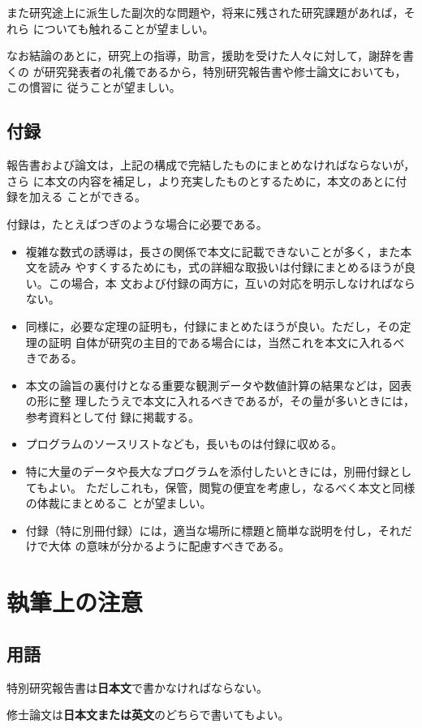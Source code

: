 \documentclass[master]{kuisthesis}		%
\let\EM\bf
\begin{document}
また研究途上に派生した副次的な問題や，将来に残された研究課題があれば，それら
についても触れることが望ましい。

なお結論のあとに，研究上の指導，助言，援助を受けた人々に対して，謝辞を書くの
が研究発表者の礼儀であるから，特別研究報告書や修士論文においても，この慣習に
従うことが望ましい。

\subsection{付録}\label{subsec-appendix}
報告書および論文は，上記の構成で完結したものにまとめなければならないが，さら
に本文の内容を補足し，より充実したものとするために，本文のあとに付録を加える
ことができる。

付録は，たとえばつぎのような場合に必要である。
\begin{itemize}%
\item
複雑な数式の誘導は，長さの関係で本文に記載できないことが多く，また本文を読み
やすくするためにも，式の詳細な取扱いは付録にまとめるほうが良い。この場合，本
文および付録の両方に，互いの対応を明示しなければならない。
\item
同様に，必要な定理の証明も，付録にまとめたほうが良い。ただし，その定理の証明
自体が研究の主目的である場合には，当然これを本文に入れるべきである。
\item
本文の論旨の裏付けとなる重要な観測データや数値計算の結果などは，図表の形に整
理したうえで本文に入れるべきであるが，その量が多いときには，参考資料として付
録に掲載する。
\item
プログラムのソースリストなども，長いものは付録に収める。
\item
特に大量のデータや長大なプログラムを添付したいときには，別冊付録としてもよい。
ただしこれも，保管，閲覧の便宜を考慮し，なるべく本文と同様の体裁にまとめるこ
とが望ましい。
\item
付録（特に別冊付録）には，適当な場所に標題と簡単な説明を付し，それだけで大体
の意味が分かるように配慮すべきである。
\end{itemize}%

\section{執筆上の注意}\label{sec-instruction}
\subsection{用語}\label{subsec-language}
特別研究報告書は{\EM 日本文}で書かなければならない。

修士論文は{\EM 日本文または英文}のどちらで書いてもよい。
\end{document}
